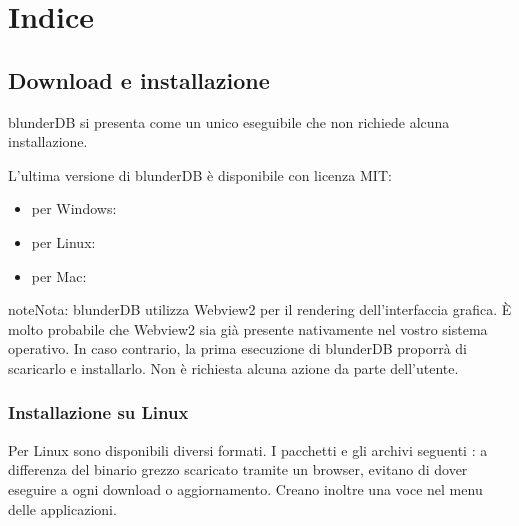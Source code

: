 \documentclass[letterpaper,10pt,italian]{sphinxmanual}
\begin{document}
\chapter{Indice}
\label{\detokenize{index:sommaire}}
\sphinxstepscope


\section{Download e installazione}
\label{\detokenize{telecharge_install:telechargement-et-installation}}\label{\detokenize{telecharge_install:telecharge-install}}\label{\detokenize{telecharge_install::doc}}
\sphinxAtStartPar
blunderDB si presenta come un unico eseguibile che non richiede alcuna installazione.

\sphinxAtStartPar
L’ultima versione di blunderDB è disponibile con licenza MIT:
\begin{itemize}
\item {} 
\sphinxAtStartPar
per Windows: 

\item {} 
\sphinxAtStartPar
per Linux: 

\item {} 
\sphinxAtStartPar
per Mac: 

\end{itemize}

\begin{sphinxadmonition}{note}{Nota:}
\sphinxAtStartPar
blunderDB utilizza Webview2 per il rendering dell’interfaccia grafica. È molto probabile che Webview2 sia già presente nativamente nel vostro sistema operativo. In caso contrario, la prima esecuzione di blunderDB proporrà di scaricarlo e installarlo. Non è richiesta alcuna azione da parte dell’utente.
\end{sphinxadmonition}


\subsection{Installazione su Linux}
\label{\detokenize{telecharge_install:installation-sous-linux}}
\sphinxAtStartPar
Per Linux sono disponibili diversi formati. I pacchetti e gli archivi seguenti : a differenza del binario grezzo scaricato tramite un browser, evitano di dover eseguire  a ogni download o aggiornamento. Creano inoltre una voce nel menu delle applicazioni.
\end{document}
